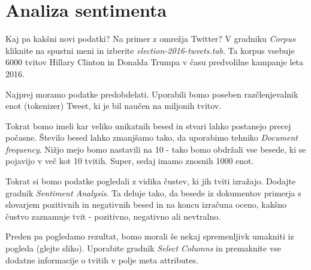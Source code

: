 \chapter{Analiza sentimenta}
\label{ch:analiza-sentimenta}

Kaj pa kakšni novi podatki? Na primer z omrežja Twitter? V gradniku \textit{Corpus} kliknite na spustni meni in izberite \textit{election-2016-tweets.tab}. Ta korpus vsebuje 6000 tvitov Hillary Clinton in Donalda Trumpa v času predvolilne kampanje leta 2016.

Najprej moramo podatke predobdelati. Uporabili bomo poseben razčlenjevalnik enot (tokenizer) Tweet, ki je bil naučen na miljonih tvitov.

Tokrat bomo imeli kar veliko unikatnih besed in stvari lahko postanejo precej počasne. Število besed lahko zmanjšamo tako, da uporabimo tehniko \textit{Document frequency}. Nižjo mejo bomo nastavili na 10 - tako bomo obdržali vse besede, ki se pojavijo v več kot 10 tvitih. Super, sedaj imamo znosnih 1000 enot.

Tokrat si bomo podatke pogledali z vidika čustev, ki jih tviti izražajo. Dodajte gradnik \textit{Sentiment Analysis}. Ta deluje tako, da besede iz dokumentov primerja s slovarjem pozitivnih in negativnih besed in na koncu izračuna oceno, kakšno čustvo zaznamuje tvit - pozitivno, negativno ali nevtralno.

Preden pa pogledamo rezultat, bomo morali še nekaj spremenljivk umakniti iz pogleda (glejte sliko). Uporabite gradnik \textit{Select Columns} in premaknite vse dodatne informacije o tvitih v polje meta attributes.

